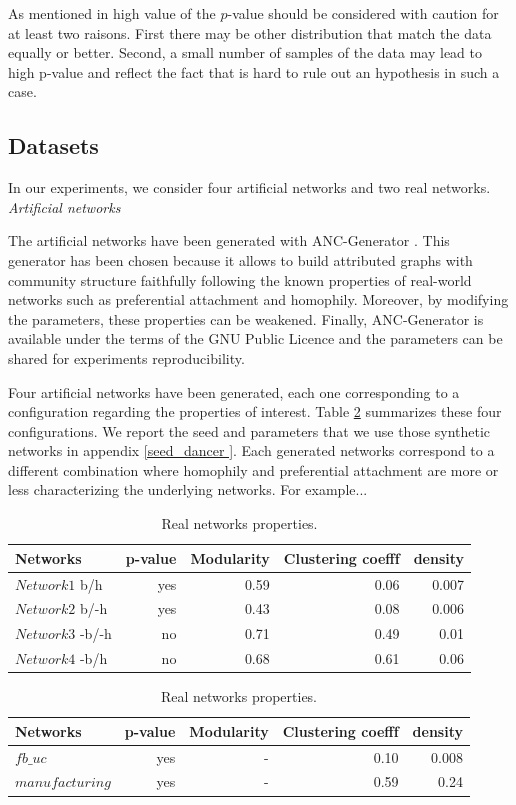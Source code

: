 As mentioned in \cite{clauset2009power} high value of the $p$-value should be considered with caution for at least two raisons. First there may be other distribution that match the data equally or better. Second, a small number of samples of the data may lead to high p-value and reflect the fact that is hard to rule out an hypothesis in such a case.

\subsection{Datasets}
In our experiments, we consider four artificial networks and two real networks.\\

\textit{Artificial networks}

The artificial networks have been generated with ANC-Generator \cite{largeron2015}. This generator has been chosen because it allows to build attributed graphs with  community structure faithfully following the known properties of real-world networks such as preferential attachment and homophily.
Moreover, by modifying the parameters, these properties can be weakened. Finally, ANC-Generator is available under the terms of the GNU Public Licence and the        parameters can be shared for experiments reproducibility.

Four artificial networks have been generated, each one corresponding to a configuration  regarding the properties of interest.
Table \ref{table:artificial_networks} summarizes these four configurations. We report the seed and parameters that we use those synthetic networks in appendix \ref{seed_dancer	}. Each generated networks correspond to a different combination where homophily and preferential attachment are more or less characterizing the underlying networks. For example...

\begin{table}[h] \label{table:artificial_networks}
	\caption{Artificial networks properties.}
	\begin{tabular}{lrrrr}
		\hline
		Networks   &  p-value    &  Modularity & Clustering coefff & density   \\
		\hline
		$Network1$ b/h   & yes &0.59  & 0.06 & 0.007  \\
		$Network2$ b/-h  & yes &0.43  & 0.08 & 0.006\\
		$Network3$ -b/-h & no  &0.71  & 0.49 & 0.01 \\
		$Network4$ -b/h  & no  &0.68  & 0.61 & 0.06 \\
		\hline
	\end{tabular}
	\caption{Real networks properties.}
	\begin{tabular}{lrrrr}
		\hline
		Networks    &  p-value    &  Modularity & Clustering coefff & density   \\
		\hline
		$fb\_uc$          & yes & -  & 0.10 & 0.008 \\
		$manufacturing$   & yes & -  & 0.59 & 0.24 \\
	\end{tabular}
\end{table}

